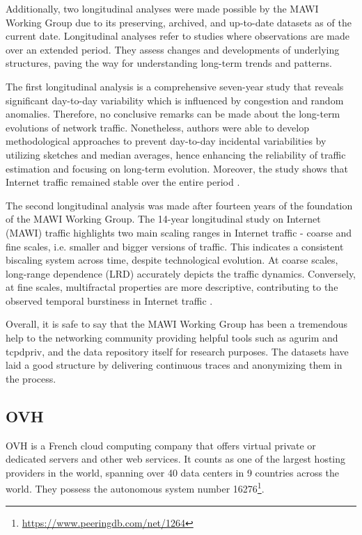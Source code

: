 \documentclass[sigconf,authorversion,nonacm]{acmart}
\begin{document}
Additionally, two longitudinal analyses were made possible by the MAWI Working Group due to its preserving, archived, and up-to-date datasets as of the current date. Longitudinal analyses refer to studies where observations are made over an extended period. They assess changes and developments of underlying structures, paving the way for understanding long-term trends and patterns. 

The first longitudinal analysis is a comprehensive seven-year study that reveals significant day-to-day variability which is influenced by congestion and random anomalies. Therefore, no conclusive remarks can be made about the long-term evolutions of network traffic. Nonetheless, authors were able to develop methodological approaches to prevent day-to-day incidental variabilities by utilizing sketches and median averages, hence enhancing the reliability of traffic estimation and focusing on long-term evolution. Moreover, the study shows that Internet traffic remained stable over the entire period \cite{5061979}. 

The second longitudinal analysis was made after fourteen years of the foundation of the MAWI Working Group. The 14-year longitudinal study on Internet (MAWI) traffic highlights two main scaling ranges in Internet traffic - coarse and fine scales, i.e. smaller and bigger versions of traffic. This indicates a consistent biscaling system across time, despite technological evolution. At coarse scales, long-range dependence (LRD) accurately depicts the traffic dynamics. Conversely, at fine scales, multifractal properties are more descriptive, contributing to the observed temporal burstiness in Internet traffic \cite{7878657}.

Overall, it is safe to say that the MAWI Working Group has been a tremendous help to the networking community providing helpful tools such as agurim and tcpdpriv, and the data repository itself for research purposes. The datasets have laid a good structure by delivering continuous traces and anonymizing them in the process. 

\subsection{OVH}
OVH is a French cloud computing company that offers virtual private or dedicated servers and other web services. It counts as one of the largest hosting providers in the world, spanning over 40 data centers in 9 countries across the world. They possess the autonomous system number 16276\footnote{\url{https://www.peeringdb.com/net/1264}}.
\end{document}
